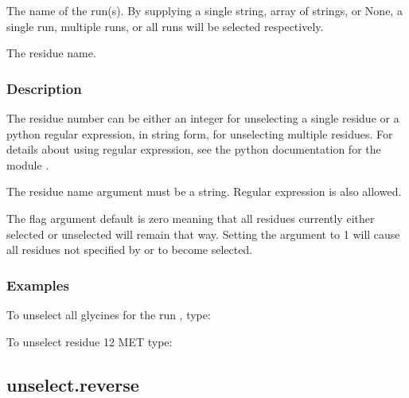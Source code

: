   The name of the run(s).  By supplying a single string, array of strings, or None, a single run, multiple runs, or all runs will be selected respectively.

  The residue name.


\subsubsection{Description}

The residue number can be either an integer for unselecting a single residue or a python
regular expression, in string form, for unselecting multiple residues.  For details about
using regular expression, see the python documentation for the module 
.

The residue name argument must be a string.  Regular expression is also allowed.

The 
 flag argument default is zero meaning that all residues currently either
selected or unselected will remain that way.  Setting the argument to 1 will cause all
residues not specified by 
 or 
 to become selected.


\subsubsection{Examples}

To unselect all glycines for the run 
, type:




To unselect residue 12 MET type:








\newpage

\subsection{unselect.reverse}



